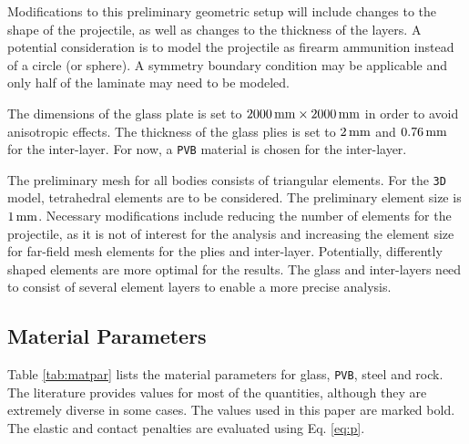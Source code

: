 \documentclass[format=acmtog,12pt,screen=true,review=false,natbib=false,]{acmart}
\begin{document}
\bigbreak
Modifications to this preliminary geometric setup will include changes to the shape of the projectile, as well as changes to the thickness of the layers. A potential consideration is to model the projectile as firearm ammunition instead of a circle (or sphere). A symmetry boundary condition may be applicable and only half of the laminate may need to be modeled.

\bigbreak
The dimensions of the glass plate is set to $2000\,{\rm{mm}}\times2000\,{\rm{mm}}$ in order to avoid anisotropic effects. The thickness of the glass plies is set to $2\,{\rm{mm}}$ and $0.76\,{\rm{mm}}$ for the inter-layer. For now, a \texttt{PVB} material is chosen for the inter-layer.

\bigbreak
The preliminary mesh for all bodies consists of triangular elements. For the \texttt{3D} model, tetrahedral elements \cite{Che18} are to be considered. The preliminary element size is $1\,{\rm{mm}}$. Necessary modifications include reducing the number of elements for the projectile, as it is not of interest for the analysis and increasing the element size for far-field mesh elements for the plies and inter-layer. Potentially, differently shaped elements are more optimal for the results. The glass and inter-layers need to consist of several element layers to enable a more precise analysis. 

\subsection{Material Parameters}
\label{subsec:MaterialParameters}

Table \ref{tab:matpar} lists the material parameters for glass, \texttt{PVB}, steel and rock. The literature provides values for most of the quantities, although they are extremely diverse in some cases. The values used in this paper are marked bold. The elastic and contact penalties are evaluated using Eq. \ref{eq:p}.
\end{document}
